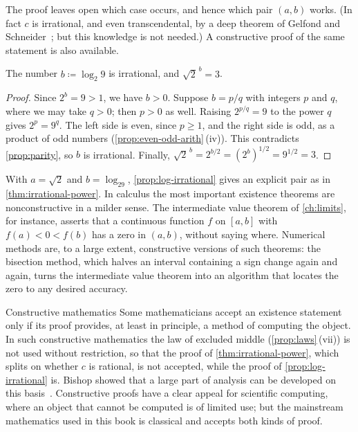 The proof leaves open which case occurs, and hence which pair $(a,b)$ works. (In fact $c$ is irrational, and even transcendental, by a deep theorem of Gelfond and Schneider~\cite{baker1975}; but this knowledge is not needed.) A constructive proof of the same statement is also available.

\begin{proposition}
\label{prop:log-irrational}
The number $b\coloneqq\log_2 9$ is irrational, and $\sqrt2^{\,b}=3$.
\end{proposition}

\begin{proof}
Since $2^b=9>1$, we have $b>0$. Suppose $b=p/q$ with integers $p$ and $q$, where we may take $q>0$; then $p>0$ as well. Raising $2^{p/q}=9$ to the power $q$ gives $2^p=9^q$. The left side is even, since $p\ge1$, and the right side is odd, as a product of odd numbers (\cref{prop:even-odd-arith}\,(iv)). This contradicts \cref{prop:parity}, so $b$ is irrational. Finally, $\sqrt2^{\,b}=2^{b/2}=(2^b)^{1/2}=9^{1/2}=3$.
\end{proof}

With $a=\sqrt2$ and $b=\log_29$, \cref{prop:log-irrational} gives an explicit pair as in \cref{thm:irrational-power}. In calculus the most important existence theorems are nonconstructive in a milder sense. The intermediate value theorem of \cref{ch:limits}, for instance, asserts that a continuous function $f$ on $[a,b]$ with $f(a)<0<f(b)$ has a zero in $(a,b)$, without saying where. Numerical methods are, to a large extent, constructive versions of such theorems: the bisection method, which halves an interval containing a sign change again and again, turns the intermediate value theorem into an algorithm that locates the zero to any desired accuracy.

\begin{note}{Constructive mathematics}
Some mathematicians accept an existence statement only if its proof provides, at least in principle, a method of computing the object. In such constructive mathematics the law of excluded middle (\cref{prop:laws}\,(vii)) is not used without restriction, so that the proof of \cref{thm:irrational-power}, which splits on whether $c$ is rational, is not accepted, while the proof of \cref{prop:log-irrational} is. Bishop showed that a large part of analysis can be developed on this basis~\cite{bishop1967}. Constructive proofs have a clear appeal for scientific computing, where an object that cannot be computed is of limited use; but the mainstream mathematics used in this book is classical and accepts both kinds of proof.
\end{note}

